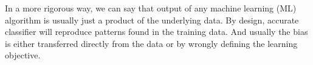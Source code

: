 In a more rigorous way, we can say that output of any machine learning (ML) algorithm is usually just a product of the underlying data. By design, accurate classifier will reproduce patterns found in the training data. And usually the bias is either transferred directly from the data or by wrongly defining the learning objective.




